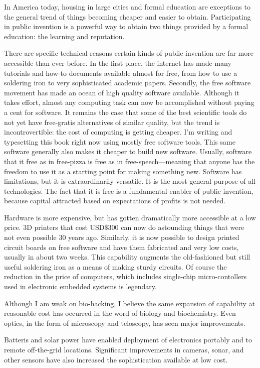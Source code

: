 \documentclass[
	fontsize=10pt, %
	twoside=false, %
	secnumdepth=1, %
]{kaobook}
\begin{document}
In America today, housing in large cities
and formal education are exceptions
to the general trend of things becoming cheaper and easier to obtain.
Participating in public invention is a powerful way to
obtain two things provided by a formal education:
the learning and reputation.

There are specific technical reasons certain kinds of
public invention are far more accessible than ever before.
In the first place, the internet has made many tutorials
and how-to documents available almost for free, from
how to use a soldering iron to very sophisticated academic
papers.
Secondly, the free software movement has made an ocean
of high quality software available.
Although it takes effort, almost any computing task can
now be accomplished without paying a cent for software.
It remains the case that some of the best scientific tools
do not yet have free-gratis alternatives of similar quality,
but the trend is incontrovertible: the cost of computing
is getting cheaper.
I'm writing and typesetting this book right now
using mostly free software tools.
This same software generally also makes it cheaper to
build new software.
Usually, software that it free
as in free-pizza is free as in free-speech---meaning that
anyone has the freedom to use it as a starting point for making
something new.
Software has limitations, but it is extraordinarily versatile.
It is the most general-purpose of all technologies. The fact
that it is free is a fundamental enabler of public invention,
because capital attracted based on expectations of profits is
not needed.

Hardware is more expensive, but has gotten dramatically
more accessible at a low price. 3D printers that cost USD\$300
can now do astounding things that were not even possible 30
years ago. Similarly, it is now possible to design printed
circuit boards on free software and have them fabricated
and very low costs, usually in about two weeks.
This capability augments the old-fashioned but still
useful soldering iron as a means of making sturdy circuits.
Of course the reduction in the price of computers, which
includes single-chip micro-contollers used in electronic
embedded systems is legendary.

Although I am weak on bio-hacking, I believe the same
expansion of capability at reasonable cost has occurred in
the word of biology and biochemistry.
Even optics, in the form of microscopy and teloscopy,
has seen major improvements.

Batteris and solar power have enabled deployment of
electronics portably and to remote off-the-grid locations.
Significant improvements in cameras, sonar, and other
sensors have also increased the sophistication available
at low cost.
\end{document}
